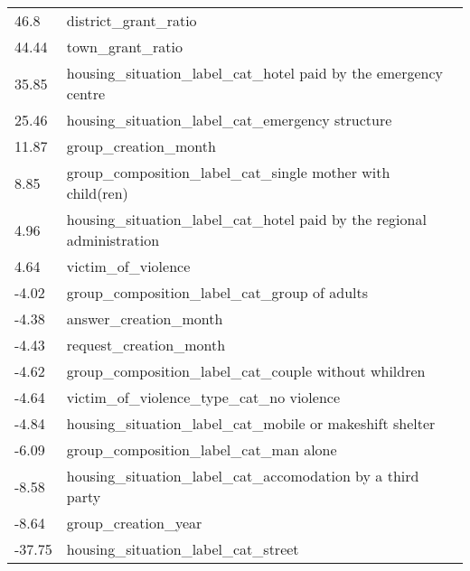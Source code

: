 \documentclass[11pt]{article}
\theoremstyle{definition}
\begin{document}
        \begin{table}[H]
            \begin{tabular}{ll}
            46.8   & district\_grant\_ratio                                                    \\
            44.44  & town\_grant\_ratio                                                        \\
            35.85  & housing\_situation\_label\_cat\_hotel paid by the emergency centre        \\
            25.46  & housing\_situation\_label\_cat\_emergency structure                       \\
            11.87  & group\_creation\_month                                                    \\
            8.85   & group\_composition\_label\_cat\_single mother with child(ren)             \\
            4.96   & housing\_situation\_label\_cat\_hotel paid by the regional administration \\
            4.64   & victim\_of\_violence                                                      \\
            -4.02  & group\_composition\_label\_cat\_group of adults                           \\
            -4.38  & answer\_creation\_month                                                   \\
            -4.43  & request\_creation\_month                                                  \\
            -4.62  & group\_composition\_label\_cat\_couple without whildren                   \\
            -4.64  & victim\_of\_violence\_type\_cat\_no violence                              \\
            -4.84  & housing\_situation\_label\_cat\_mobile or makeshift shelter               \\
            -6.09  & group\_composition\_label\_cat\_man alone                                 \\
            -8.58  & housing\_situation\_label\_cat\_accomodation by a third party             \\
            -8.64  & group\_creation\_year                                                     \\
            -37.75 & housing\_situation\_label\_cat\_street                                   
            \end{tabular}
        \end{table}
\end{document}

